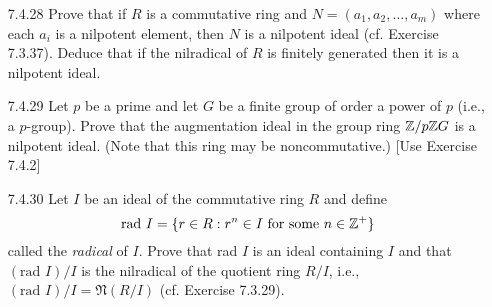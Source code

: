 \begin{enumerate}
      \textbf{Proof.} Suppose that $a$ is a nilpotent element of $R$. Let
      $b \in R$. Then Exercise 7.1.14(b) says that $a(-b)$ is nilpotent in $R$.
      Thus $1 + a(-b) = 1 - ab$ is a unit in $R$ by Exercise 7.1.14(c). \qed
   \item[7.4.28]  Prove that if $R$ is a commutative ring and
                  $N = (a_1, a_2, \ldots, a_m)$ where each $a_i$ is a nilpotent
                  element, then $N$ is a nilpotent ideal (cf. Exercise 7.3.37).
                  Deduce that if the nilradical of $R$ is finitely generated
                  then it is a nilpotent ideal.
   \item[7.4.29]  Let $p$ be a prime and let $G$ be a finite group of order a
                  power of $p$ (i.e., a $p$-group). Prove that the augmentation
                  ideal in the group ring $\mathbb{Z}/p\mathbb{Z} G$ is a nilpotent ideal. (Note
                  that this ring may be noncommutative.) [Use Exercise 7.4.2]
   \item[7.4.30]  Let $I$ be an ideal of the commutative ring $R$ and define
                  $$\text{rad }I = \{r \in R : r^n \in I
                    \text{ for some }n \in \mathbb{Z}^+\}$$
                  called the \textit{radical} of $I$. Prove that rad $I$ is an
                  ideal containing $I$ and that $(\text{rad }I)/I$ is the
                  nilradical of the quotient ring $R/I$, i.e.,
                  $(\text{rad } I)/I = \mathfrak{N}(R/I)$ (cf. Exercise 7.3.29).
                  

\end{enumerate}
